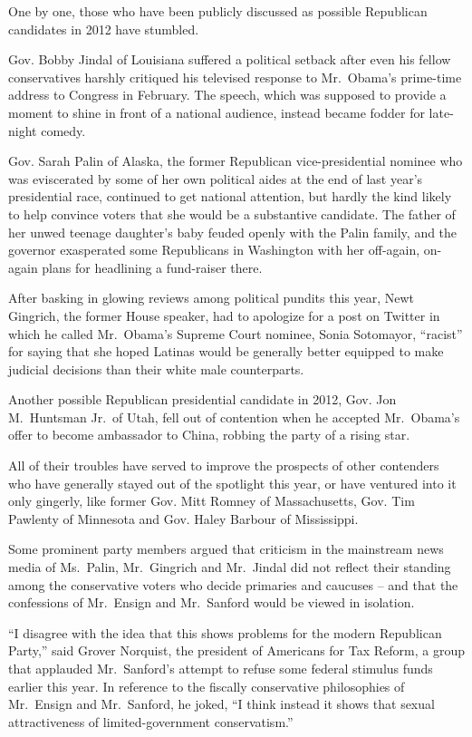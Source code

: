 ﻿\documentclass[12pt]{article}
\begin{document}
One by one, those who have been publicly discussed as possible Republican candidates in 2012 have
stumbled.

Gov. Bobby Jindal of Louisiana suffered a political setback after even his fellow conservatives
harshly critiqued his televised response to Mr.~Obama's prime-time address to Congress in February.
The speech, which was supposed to provide a moment to shine in front of a national audience, instead
became fodder for late-night comedy.

Gov. Sarah Palin of Alaska, the former Republican vice-presidential nominee who was eviscerated by
some of her own political aides at the end of last year's presidential race, continued to get
national attention, but hardly the kind likely to help convince voters that she would be a
substantive candidate. The father of her unwed teenage daughter's baby feuded openly with the Palin
family, and the governor exasperated some Republicans in Washington with her off-again, on-again
plans for headlining a fund-raiser there.

After basking in glowing reviews among political pundits this year, Newt Gingrich, the former House
speaker, had to apologize for a post on Twitter in which he called Mr.~Obama's Supreme Court
nominee, Sonia Sotomayor, ``racist'' for saying that she hoped Latinas would be generally better
equipped to make judicial decisions than their white male counterparts.

Another possible Republican presidential candidate in 2012, Gov. Jon M.~Huntsman Jr.~of Utah, fell
out of contention when he accepted Mr.~Obama's offer to become ambassador to China, robbing the
party of a rising star.

All of their troubles have served to improve the prospects of other contenders who have generally
stayed out of the spotlight this year, or have ventured into it only gingerly, like former Gov. Mitt
Romney of Massachusetts, Gov. Tim Pawlenty of Minnesota and Gov. Haley Barbour of Mississippi.

Some prominent party members argued that criticism in the mainstream news media of Ms.~Palin,
Mr.~Gingrich and Mr.~Jindal did not reflect their standing among the conservative voters who decide
primaries and caucuses -- and that the confessions of Mr.~Ensign and Mr.~Sanford would be viewed in
isolation.

``I disagree with the idea that this shows problems for the modern Republican Party,'' said Grover
Norquist, the president of Americans for Tax Reform, a group that applauded Mr.~Sanford's attempt to
refuse some federal stimulus funds earlier this year. In reference to the fiscally conservative
philosophies of Mr.~Ensign and Mr.~Sanford, he joked, ``I think instead it shows that sexual
attractiveness of limited-government conservatism.''
\end{document}

